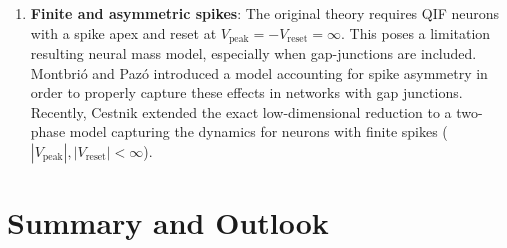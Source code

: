 \documentclass[11pt]{article}
\numberwithin{equation}{section}
\newcommand{\rev}[1]{\begingroup\color{black}#1\endgroup}
\begin{document}
\begin{enumerate}
    \rev{\item \textbf{Finite and asymmetric spikes}: The original theory requires QIF neurons with a 
    spike apex and reset at $V_\text{peak}=-V_\text{reset} = \infty$. This poses a limitation resulting neural mass model,
    especially when gap-junctions are included. Montbrió and Pazó \cite{montbrio2020} introduced a model accounting for spike asymmetry
     in order to properly capture these effects in networks with gap junctions. Recently, Cestnik \cite{cestnik2026} extended the exact low-dimensional reduction to a two-phase model capturing the dynamics for neurons with finite spikes ($|V_\text{peak}|,|V_\text{reset}| < \infty$).}
\end{enumerate}







\clearpage \section{Summary and Outlook}
\end{document}
